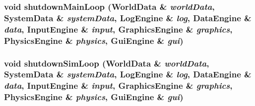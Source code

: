 \subsubsection{\setlength{\rightskip}{0pt plus 5cm}void shutdown\-Main\-Loop ({\bf World\-Data} \& {\em world\-Data}, {\bf System\-Data} \& {\em system\-Data}, {\bf Log\-Engine} \& {\em log}, {\bf Data\-Engine} \& {\em data}, {\bf Input\-Engine} \& {\em input}, {\bf Graphics\-Engine} \& {\em graphics}, {\bf Physics\-Engine} \& {\em physics}, {\bf Gui\-Engine} \& {\em gui})}\label{main_8cpp_a9}


\subsubsection{\setlength{\rightskip}{0pt plus 5cm}void shutdown\-Sim\-Loop ({\bf World\-Data} \& {\em world\-Data}, {\bf System\-Data} \& {\em system\-Data}, {\bf Log\-Engine} \& {\em log}, {\bf Data\-Engine} \& {\em data}, {\bf Input\-Engine} \& {\em input}, {\bf Graphics\-Engine} \& {\em graphics}, {\bf Physics\-Engine} \& {\em physics}, {\bf Gui\-Engine} \& {\em gui})}\label{main_8cpp_a5}


